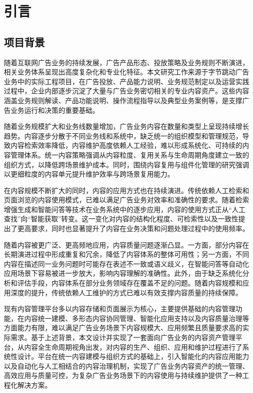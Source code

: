 \chapter{引言}
\section{项目背景}
随着互联网广告业务的持续发展，广告产品形态、投放策略及业务规则不断演进，相关业务体系呈现出高度复杂化和专业化特征。本文研究工作来源于字节跳动广告业务中的实际工程项目，在广告投放、产品能力说明、业务规范制定以及运营实践过程中，企业内部逐步沉淀了大量与广告业务密切相关的专业内容资产。这些内容涵盖业务规则解读、产品功能说明、操作流程指导以及典型业务案例等，是支撑广告业务运行和决策的重要基础\cite{kero2023systematic,gelashvili2025navigating}。

随着业务规模扩大和业务线数量增加，广告业务内容在数量和类型上呈现持续增长趋势。内容逐步分散于不同业务线和系统中，缺乏统一的组织模型和管理规范，导致内容检索效率降低，内容维护高度依赖人工经验，难以形成系统化、可持续的内容管理体系\cite{alalwan2012enterprise,le2015enterprise}。统一内容策略强调从内容粒度、复用关系与生命周期角度建立一致的组织方式，以降低跨场景维护成本\cite{le2015enterprise}。同时，围绕内容复用与组件化管理的研究强调以更细粒度的内容单元提升维护效率与跨场景复用能力\cite{andersen2016current}。

在内容规模不断扩大的同时，内容的应用方式也在持续演进。传统依赖人工检索和页面浏览的内容使用模式，已难以满足广告业务对效率和准确性的要求。随着检索增强生成和智能问答等技术在业务系统中的逐步应用，内容的使用方式正从“人工查找”向“智能获取”转变\cite{lewis2020retrieval,fan2024survey}。这一变化对内容的结构化程度、可检索性以及一致性提出了更高要求，同时也显著提升了内容在业务决策和问题处理过程中的使用频率。

随着内容被更广泛、更高频地应用，内容质量问题逐渐凸显。一方面，部分内容在长期演进过程中形成重复和冗余，降低了内容体系的整体可用性；另一方面，不同内容在描述同一业务问题时可能存在表述不一致或语义歧义，在智能问答等自动化应用场景下容易被进一步放大，影响内容理解的准确性。此外，由于缺乏系统化分析和评估手段，内容体系在部分业务领域存在覆盖不足的问题。随着内容规模和应用深度的提升，传统依赖人工维护的方式已难以有效支撑内容质量的持续保障。

现有内容管理平台多以内容存储和页面展示为核心，主要提供基础的内容管理功能，在内容统一建模、多形态内容协同管理、智能化应用支持以及内容质量治理等方面能力有限，难以满足广告业务场景下内容规模大、应用频繁且质量要求高的实际需求。基于上述背景，本文设计并实现了一套面向广告业务的内容资产管理平台，从内容全生命周期视角出发，对内容的生产、组织、应用和维护过程进行了系统性设计。平台在统一内容建模与组织方式的基础上，引入智能化的内容应用能力以及自动化与人工相结合的内容治理机制，实现了广告业务内容资产的统一管理、高效应用与质量可控，为复杂广告业务场景下的内容使用与持续维护提供了一种工程化解决方案。


